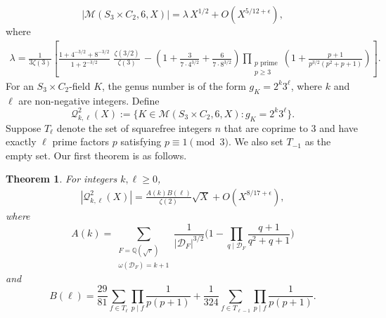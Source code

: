 \documentclass[11pt,reqno]{amsart}
\newcommand{\Q}{\mathbb{Q}}
\newcommand{\cD}{\mathcal{D}}
\newcommand{\cM}{\mathcal{M}}
\newcommand{\cQ}{\mathcal{Q}}
\newtheorem{theorem}{Theorem}[section]
\theoremstyle{definition}
\theoremstyle{remark}
\begin{document}
\begin{equation*}
    |\cM(S_3\times C_2, 6, X)| = \lambda \, X^{1/2} + O\left(X^{5/12+\epsilon}\right),
\end{equation*}
where
 \begin{align*}
   \lambda = \frac{1}{3\zeta(3)}\left[ \frac{1+ 4^{-3/2} + 8^{-3/2}}{1+2^{-3/2}}\,\, \frac{\zeta(3/2)}{\zeta(3)} \, - \left(1 + \frac{3}{7\cdot 4^{3/2}} + \frac{6}{7\cdot 8^{3/2}}\right)\prod_{\substack{p\text{ prime}\\ p \geq 3}} \left(1 + \frac{p+1}{p^{3/2}(p^2+p+1)}\right) \right] .
\end{align*}
For an $S_3\times C_2$-field $K$, the genus number is of the form $g_K=2^k 3^{\ell}$, where $k$ and $\ell$ are non-negative integers. Define
\begin{equation*}
    \cQ_{k,\ell}^2(X):= \{K\in \cM(S_3\times C_2,6,X) : g_K = 2^k 3^{\ell}\}. 
\end{equation*}
 Suppose $ T_{\ell} $ 
denote the set of squarefree integers $ n $ that are coprime to 3 and have exactly $ \ell $ prime factors $ p$ satisfying $ p \equiv 1 \pmod{3} $. We also set $T_{-1}$ as the empty set. Our first theorem is as follows. 
\begin{theorem}\label{S_3-C_2-theorem}
    For integers $k,\ell\geq 0$,
    \begin{align*}
        |\cQ_{k,\ell}^2(X)| = \frac{A(k) B(\ell)}{\zeta(2)}\sqrt{X} + O\left(X^{8/17 +\epsilon}\right),
    \end{align*}
where 
    $$
        A(k) =  \sum_{\substack{ F= \Q(\sqrt{r})  \\\omega(\cD_F) = k+1}}  \frac{1}{|\cD_F|^{3/2}}
        \bigg(1 - \prod_{q \mid \cD_F}   \frac{q+1}{q^2 + q + 1}\bigg)
    $$
and 
    $$
        B(\ell) = 
    \frac{29}{81} \sum_{f \in T_{\ell}} \prod_{p \mid f} \frac{1}{p(p+1)}
   + \frac{1}{324} \sum_{f \in T_{\ell-1}} \prod_{p \mid f} \frac{1}{p(p+1)}.
    $$
\end{theorem}
\end{document}
